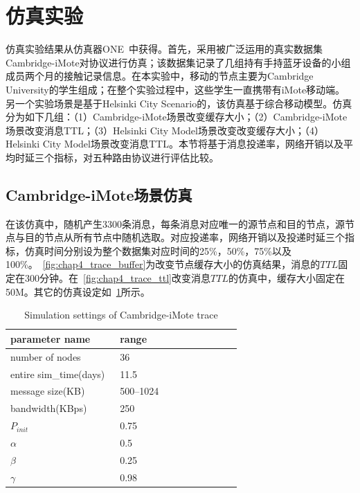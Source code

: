 \section{仿真实验}
\label{chap4:仿真实验}

仿真实验结果从仿真器ONE~中获得。首先，采用被广泛运用的真实数据集Cambridge-iMote对协议进行仿真；该数据集记录了几组持有手持蓝牙设备的小组成员两个月的接触记录信息。在本实验中，移动的节点主要为Cambridge University的学生组成；在整个实验过程中，这些学生一直携带有iMote移动端。另一个实验场景是基于Helsinki City Scenario的，该仿真基于综合移动模型。仿真分为如下几组：（1）Cambridge-iMote场景改变缓存大小；（2）Cambridge-iMote场景改变消息TTL；（3）Helsinki City Model场景改变改变缓存大小；（4）Helsinki City Model场景改变消息TTL。本节将基于消息投递率，网络开销以及平均时延三个指标，对五种路由协议进行评估比较。

\subsection{Cambridge-iMote场景仿真}

在该仿真中，随机产生3300条消息，每条消息对应唯一的源节点和目的节点，源节点与目的节点从所有节点中随机选取。对应投递率，网络开销以及投递时延三个指标，仿真时间分别设为整个数据集对应时间的25\%，50\%，75\%以及100\%。\figurename~\ref{fig:chap4_trace_buffer}为改变节点缓存大小的仿真结果，消息的$TTL$固定在300分钟。在\figurename~\ref{fig:chap4_trace_ttl}改变消息$TTL$的仿真中，缓存大小固定在50M。其它的仿真设定如\tablename~\ref{tab:chap4_simulation}所示。


\begin{table}
\centering
\caption{Simulation settings of Cambridge-iMote trace}
\label{tab:chap4_simulation}
\begin{tabular}{
p{0.45\linewidth}<{\centering}
p{0.5\linewidth}<{\centering}
}
\hline
\textbf{parameter name} & \textbf{range} \\
\hline
number of nodes & 36  \\
entire sim\_time(days) & 11.5 \\
message size(KB) & 500--1024 \\
bandwidth(KBps) & 250 \\
$P_{init}$ & 0.75 \\
$\alpha$ & 0.5 \\
$\beta$ & 0.25 \\
$\gamma$ & 0.98 \\
\hline
\end{tabular}
\end{table}


